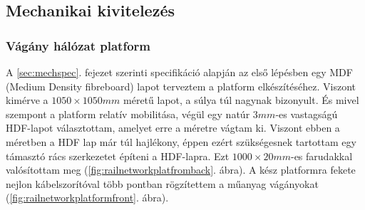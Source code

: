 \documentclass[a4paper,12pt]{article}
\begin{document}
\subsection{Mechanikai kivitelezés}
\subsubsection{Vágány hálózat platform}
A \ref{sec:mechspec}. fejezet szerinti specifikáció alapján az első lépésben egy MDF (Medium Density fibreboard) lapot terveztem a platform elkészítéséhez.
Viszont kimérve a $1050\times1050mm$ méretű lapot, a súlya túl nagynak bizonyult. 
És mivel szempont a platform relatív mobilitása, végül egy natúr $3mm$-es vastagságú HDF-lapot választottam, amelyet erre a méretre vágtam ki.
Viszont ebben a méretben a HDF lap már túl hajlékony, éppen ezért szükségesnek tartottam egy támasztó rács szerkezetet építeni a HDF-lapra.
Ezt $1000\times20mm$-es farudakkal valósítottam meg (\ref{fig:railnetworkplatfromback}. ábra).
A kész platformra fekete nejlon kábelszorítóval több pontban rögzítettem a műanyag vágányokat (\ref{fig:railnetworkplatformfront}. ábra).
\end{document}
